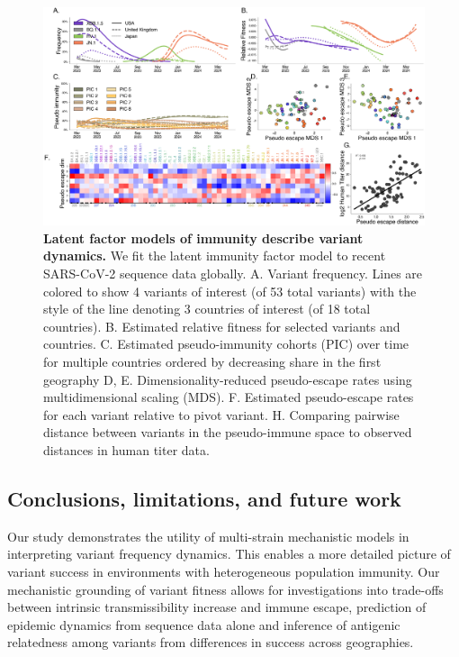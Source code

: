 \documentclass[11pt,oneside,letterpaper]{article}
\begin{document}
\begin{figure}[h]
    \centering
    \includegraphics[width=1.0\linewidth]{./figures/latent_immune.png}
    \caption{
      \textbf{Latent factor models of immunity describe variant dynamics.}
      We fit the latent immunity factor model to recent SARS-CoV-2 sequence data globally.
      A. Variant frequency. Lines are colored to show 4 variants of interest (of 53 total variants) with the style of the line denoting 3 countries of interest (of 18 total countries).
      B. Estimated relative fitness for selected variants and countries.
      C. Estimated pseudo-immunity cohorts (PIC) over time for multiple countries ordered by decreasing share in the first geography
      D, E. Dimensionality-reduced pseudo-escape rates using multidimensional scaling (MDS).
      F. Estimated pseudo-escape rates for each variant relative to pivot variant.
      H. Comparing pairwise distance between variants in the pseudo-immune space to observed distances in human titer data.
    }
    \label{fig:latent_immune}
\end{figure}

\subsection*{Conclusions, limitations, and future work}

Our study demonstrates the utility of multi-strain mechanistic models in interpreting variant frequency dynamics.
This enables a more detailed picture of variant success in environments with heterogeneous population immunity.
Our mechanistic grounding of variant fitness allows for investigations into trade-offs between intrinsic transmissibility increase and immune escape, prediction of epidemic dynamics from sequence data alone and inference of antigenic relatedness among variants from differences in success across geographies.
\end{document}
